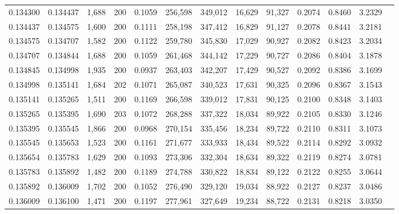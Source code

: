 \begin{tabular}{rrrrrrrrrrrrr}
0.134300 & 0.134437 &  1,688 & 200 &                                     0.1059 & 256,598 & 349,012 &  16,629 &  91,327 & 0.2074 & 0.8460 & 3.2329 \\
0.134437 & 0.134575 &  1,600 & 200 &                                     0.1111 & 258,198 & 347,412 &  16,829 &  91,127 & 0.2078 & 0.8441 & 3.2181 \\
0.134575 & 0.134707 &  1,582 & 200 &                                     0.1122 & 259,780 & 345,830 &  17,029 &  90,927 & 0.2082 & 0.8423 & 3.2034 \\
0.134707 & 0.134844 &  1,688 & 200 &                                     0.1059 & 261,468 & 344,142 &  17,229 &  90,727 & 0.2086 & 0.8404 & 3.1878 \\
0.134845 & 0.134998 &  1,935 & 200 &                                     0.0937 & 263,403 & 342,207 &  17,429 &  90,527 & 0.2092 & 0.8386 & 3.1699 \\
0.134998 & 0.135141 &  1,684 & 202 &                                     0.1071 & 265,087 & 340,523 &  17,631 &  90,325 & 0.2096 & 0.8367 & 3.1543 \\
0.135141 & 0.135265 &  1,511 & 200 &                                     0.1169 & 266,598 & 339,012 &  17,831 &  90,125 & 0.2100 & 0.8348 & 3.1403 \\
0.135265 & 0.135395 &  1,690 & 203 &                                     0.1072 & 268,288 & 337,322 &  18,034 &  89,922 & 0.2105 & 0.8330 & 3.1246 \\
0.135395 & 0.135545 &  1,866 & 200 &                                     0.0968 & 270,154 & 335,456 &  18,234 &  89,722 & 0.2110 & 0.8311 & 3.1073 \\
0.135545 & 0.135653 &  1,523 & 200 &                                     0.1161 & 271,677 & 333,933 &  18,434 &  89,522 & 0.2114 & 0.8292 & 3.0932 \\
0.135654 & 0.135783 &  1,629 & 200 &                                     0.1093 & 273,306 & 332,304 &  18,634 &  89,322 & 0.2119 & 0.8274 & 3.0781 \\
0.135783 & 0.135892 &  1,482 & 200 &                                     0.1189 & 274,788 & 330,822 &  18,834 &  89,122 & 0.2122 & 0.8255 & 3.0644 \\
0.135892 & 0.136009 &  1,702 & 200 &                                     0.1052 & 276,490 & 329,120 &  19,034 &  88,922 & 0.2127 & 0.8237 & 3.0486 \\
0.136009 & 0.136100 &  1,471 & 200 &                                     0.1197 & 277,961 & 327,649 &  19,234 &  88,722 & 0.2131 & 0.8218 & 3.0350 \\

\end{tabular}
